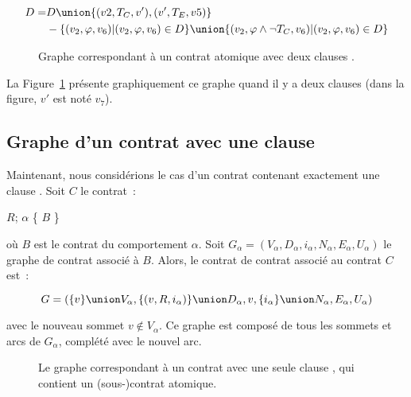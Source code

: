 \begin{equation*}
\centering
\begin{aligned}
D = & D \union \{(v2, T_C, v'), (v', T_E, v5)\} \\
    & - \{(v_2, \varphi, v_6) \vert (v_2, \varphi, v_6) \in D\} \union
      \{(v_2, \varphi \land \neg T_C, v_6) \vert (v_2, \varphi, v_6) \in D\}
\end{aligned}
\end{equation*}

\begin{figure}


\caption{\label{figure:test:throwable_graph} Graphe correspondant à un contrat
atomique avec deux clauses \athrowable.}

\end{figure}

La Figure~\ref{figure:test:throwable_graph} présente graphiquement ce graphe
quand il y a deux clauses \athrowable (dans la figure, $v'$ est noté $v_7$).

\subsection{Graphe d'un contrat avec une clause \abehavior}
\label{subsection:test:behavior_graph}

Maintenant, nous considérions le cas d'un contrat contenant exactement une
clause \abehavior. Soit $C$ le contrat~:

\begin{pre}
\arequires \(R\);
\abehavior \(\alpha\) \{ \(B\) \}
\end{pre}

où $B$ est le contrat du comportement $\alpha$. Soit $G_\alpha = (V_\alpha,
D_\alpha, i_\alpha, N_\alpha, E_\alpha, U_\alpha)$ le graphe de contrat associé
à $B$. Alors, le contrat de contrat associé au contrat $C$ est~:

$$G = (
  \{v\} \union V_\alpha,
  \{(v, R, i_\alpha)\} \union D_\alpha,
  v,
  \{i_\alpha\} \union N_\alpha,
  E_\alpha,
  U_\alpha
)$$

avec le nouveau sommet $v \notin V_\alpha$. Ce graphe est composé de tous les
sommets et arcs de $G_\alpha$, complété avec le nouvel arc.

\begin{figure}


\caption{\label{figure:test:behavior_graph} Le graphe correspondant à un contrat
avec une seule clause \abehavior, qui contient un (sous-)contrat atomique.}

\end{figure}

